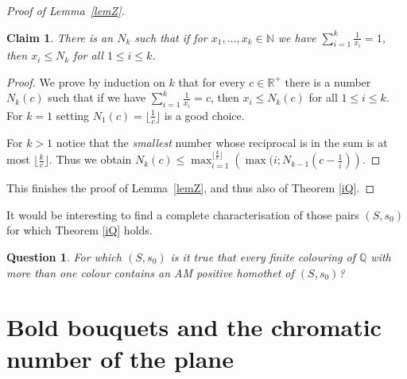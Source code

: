 \documentclass[12pt]{article}
\theoremstyle{plain}
\newtheorem{claim}[theorem]{Claim}
\newtheorem{question}[theorem]{Question}
\theoremstyle{definition}
\begin{document}
\begin{proof}[Proof of Lemma~\ref{lemZ}]
\begin{claim} There is an $N_k$ such that if for $x_1,\dots,x_k\in \mathbb{N}$ we have $\sum_{i=1}^k\frac{1}{x_i}=1$, then $x_i\leq N_k$ for all $1\leq i\leq k$.
\end{claim}
    
\begin{proof} We prove by induction on $k$ that for every $c\in \mathbb R^+$ there is a number $N_k(c)$ such that if we have $\sum_{i=1}^k\frac{1}{x_i}=c$, then $x_i\leq N_k(c)$ for all $1\leq i\leq k$.
For $k=1$ setting $N_1(c)=\lfloor \frac 1c\rfloor$ is a good choice.

For $k>1$ notice that the \emph{smallest} number whose reciprocal is in the sum is at most $\lfloor \frac kc\rfloor$. Thus we obtain $N_k(c)\le \max_{i=1}^{\lfloor \frac kc\rfloor}\left(\max(i;N_{k-1}(c-\frac 1i)\right)$.
\end{proof}
This finishes the proof of Lemma~\ref{lemZ}, and thus also of Theorem \ref{iQ}.
\end{proof}

It would be interesting to find a complete characterisation of those pairs $(S,s_0)$ for which Theorem \ref{iQ} holds.

\begin{question}
For which $(S,s_0)$ is it true that every finite colouring of $\mathbb{Q}$ with more than one colour contains an AM positive homothet of $(S,s_0)$?
\end{question}




\section{Bold bouquets and the chromatic number of the plane}\label{4}



\end{document}
